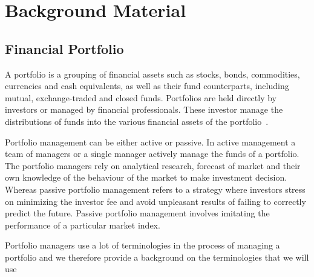 
\chapter{Background Material}\label{chap:figtab}

\section{Financial Portfolio}

A portfolio is a grouping of financial assets such as stocks, bonds, commodities, currencies and cash equivalents, as well as their fund counterparts, including mutual, exchange-traded and closed funds. Portfolios are held directly by investors or managed by financial professionals. These investor manage the distributions of funds into the various financial assets of the portfolio~\cite{stoyanov2007optimal}. 

Portfolio management can be either active or passive. In active management a team of managers or a single manager actively manage the funds of a portfolio. The portfolio managers rely on analytical research, forecast of market and their own knowledge of the behaviour of the market to make investment decision. Whereas passive portfolio management refers to a strategy where investors stress on minimizing the investor fee and avoid unpleasant results of failing to correctly predict the future. Passive portfolio management involves imitating the performance of a particular market index.

Portfolio managers use a lot of terminologies in the process of managing a portfolio and we therefore provide a background on the terminologies that we will use

